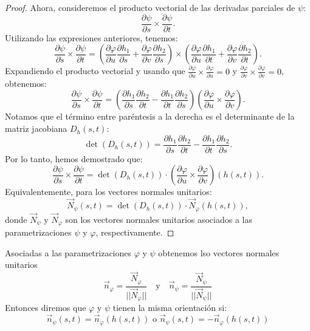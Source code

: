 \begin{proof}
    Ahora, consideremos el producto vectorial de las derivadas parciales de
    \(\psi\):
    \[
        \frac{\partial \psi}{\partial s} \times \frac{\partial \psi}{\partial t}.
    \]
    Utilizando las expresiones anteriores, tenemos:
    \[
        \frac{\partial \psi}{\partial s} \times \frac{\partial \psi}{\partial t} = \left( \frac{\partial \varphi}{\partial u} \frac{\partial h_1}{\partial s} + \frac{\partial \varphi}{\partial v} \frac{\partial h_2}{\partial s} \right) \times \left( \frac{\partial \varphi}{\partial u} \frac{\partial h_1}{\partial t} + \frac{\partial \varphi}{\partial v} \frac{\partial h_2}{\partial t} \right).
    \]
    Expandiendo el producto vectorial y usando que \(\frac{\partial
        \varphi}{\partial u} \times \frac{\partial \varphi}{\partial u} = 0\) y
    \(\frac{\partial \varphi}{\partial v} \times \frac{\partial \varphi}{\partial
        v} = 0\), obtenemos:
    \[
        \frac{\partial \psi}{\partial s} \times \frac{\partial \psi}{\partial t} = \left( \frac{\partial h_1}{\partial s} \frac{\partial h_2}{\partial t} - \frac{\partial h_1}{\partial t} \frac{\partial h_2}{\partial s} \right) \left( \frac{\partial \varphi}{\partial u} \times \frac{\partial \varphi}{\partial v} \right).
    \]
    Notamos que el término entre paréntesis a la derecha es el determinante de la
    matriz jacobiana \(D_h(s,t)\):
    \[
        \det(D_h(s,t)) = \frac{\partial h_1}{\partial s} \frac{\partial h_2}{\partial t} - \frac{\partial h_1}{\partial t} \frac{\partial h_2}{\partial s}.
    \]
    Por lo tanto, hemos demostrado que:
    \[
        \frac{\partial \psi}{\partial s} \times \frac{\partial \psi}{\partial t} = \det(D_h(s,t)) \cdot \left( \frac{\partial \varphi}{\partial u} \times \frac{\partial \varphi}{\partial v} \right)(h(s,t)).
    \]
    Equivalentemente, para los vectores normales unitarios:
    \[
        \vec{N}_{\psi}(s,t) = \det(D_h(s,t)) \cdot \vec{N}_{\varphi}(h(s,t)),
    \]
    donde \(\vec{N}_{\psi}\) y \(\vec{N}_{\varphi}\) son los vectores normales
    unitarios asociados a las parametrizaciones \(\psi\) y \(\varphi\),
    respectivamente.
\end{proof}

\begin{definición} 
Asociadas a las parametrizaciones $\varphi$ y $\psi$ obtenemos lso vectores normales unitarios
$$ \vec{n}_{\varphi} = \frac{\vec{N}_{\varphi}}{||\vec{N}_{\varphi}||} \quad \text{y} \quad \vec{n}_{\psi} = \frac{\vec{N}_{\psi}}{||\vec{N}_{\psi}||} $$
Entonces diremos que $\varphi$ y $\psi$ tienen la misma orientación si:
$$ \vec{n}_{\psi} (s,t) = \vec{n}_{\varphi}(h(s,t)) \text{  o  } \vec{n}_{\psi} (s,t) = -\vec{n}_{\varphi}(h(s,t)) $$
\end{definición}

